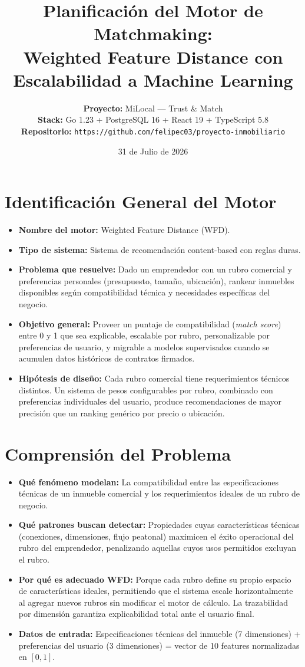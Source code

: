 \documentclass[11pt,a4paper]{article}
\title{\vspace{-2cm}\textbf{Planificación del Motor de Matchmaking: \\ Weighted Feature Distance con Escalabilidad a Machine Learning}}
\author{
    \textbf{Proyecto:} MiLocal — Trust \& Match \\
    \textbf{Stack:} Go 1.23 + PostgreSQL 16 + React 19 + TypeScript 5.8 \\
    \textbf{Repositorio:} \texttt{https://github.com/felipec03/proyecto-inmobiliario} \\
}
\date{31 de Julio de 2026}
\begin{document}
\maketitle

\section{Identificación General del Motor}
\begin{itemize}[label=\textbullet]
    \item \textbf{Nombre del motor:} Weighted Feature Distance (WFD).
    \item \textbf{Tipo de sistema:} Sistema de recomendación content-based con reglas duras.
    \item \textbf{Problema que resuelve:} Dado un emprendedor con un rubro comercial y preferencias personales (presupuesto, tamaño, ubicación), rankear inmuebles disponibles según compatibilidad técnica y necesidades específicas del negocio.
    \item \textbf{Objetivo general:} Proveer un puntaje de compatibilidad (\textit{match score}) entre 0 y 1 que sea explicable, escalable por rubro, personalizable por preferencias de usuario, y migrable a modelos supervisados cuando se acumulen datos históricos de contratos firmados.
    \item \textbf{Hipótesis de diseño:} Cada rubro comercial tiene requerimientos técnicos distintos. Un sistema de pesos configurables por rubro, combinado con preferencias individuales del usuario, produce recomendaciones de mayor precisión que un ranking genérico por precio o ubicación.
\end{itemize}

\section{Comprensión del Problema}
\begin{itemize}
    \item \textbf{Qué fenómeno modelan:} La compatibilidad entre las especificaciones técnicas de un inmueble comercial y los requerimientos ideales de un rubro de negocio.
    \item \textbf{Qué patrones buscan detectar:} Propiedades cuyas características técnicas (conexiones, dimensiones, flujo peatonal) maximicen el éxito operacional del rubro del emprendedor, penalizando aquellas cuyos usos permitidos excluyan el rubro.
    \item \textbf{Por qué es adecuado WFD:} Porque cada rubro define su propio espacio de características ideales, permitiendo que el sistema escale horizontalmente al agregar nuevos rubros sin modificar el motor de cálculo. La trazabilidad por dimensión garantiza explicabilidad total ante el usuario final.
    \item \textbf{Datos de entrada:} Especificaciones técnicas del inmueble (7 dimensiones) + preferencias del usuario (3 dimensiones) = vector de 10 features normalizadas en $[0, 1]$.
\end{itemize}
\end{document}
